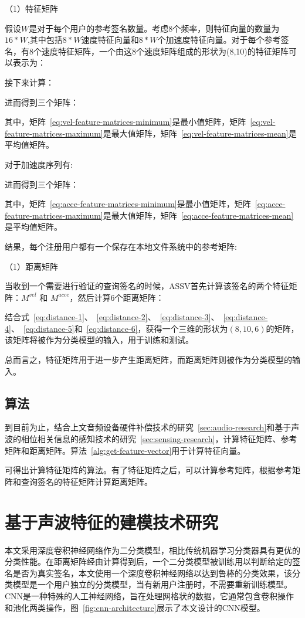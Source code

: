 （1）特征矩阵

假设$W$是对于每个用户的参考签名数量。考虑8个频率，则特征向量的数量为$16*W$,其中包括$8*W$速度特征向量和$8*W$个加速度特征向量。对于每个参考签名，有8个速度特征矩阵，一个由这8个速度矩阵组成的形状为(8,10)的特征矩阵可以表示为：

接下来计算：

进而得到三个矩阵：

其中，矩阵~\ref{eq:vel-feature-matrices-minimum}是最小值矩阵，矩阵~\ref{eq:vel-feature-matrices-maximum}是最大值矩阵，矩阵~\ref{eq:vel-feature-matrices-mean}是平均值矩阵。

对于加速度序列有:

进而得到三个矩阵：

其中，矩阵~\ref{eq:acce-feature-matrices-minimum}是最小值矩阵，矩阵~\ref{eq:acce-feature-matrices-maximum}是最大值矩阵，矩阵~\ref{eq:acce-feature-matrices-mean}是平均值矩阵。

结果，每个注册用户都有一个保存在本地文件系统中的参考矩阵:

（1）距离矩阵

当收到一个需要进行验证的查询签名的时候，ASSV首先计算该签名的两个特征矩阵：$M^{vel}$ 和 $M^{acce}$，然后计算6个距离矩阵：

结合式~\ref{eq:distance-1}、~\ref{eq:distance-2}、~\ref{eq:distance-3}、~\ref{eq:distance-4}、~\ref{eq:distance-5}和~\ref{eq:distance-6}，获得一个三维的形状为$(8,10,6)$的矩阵，该矩阵将被作为分类模型的输入，用于训练和测试。

总而言之，特征矩阵用于进一步产生距离矩阵，而距离矩阵则被作为分类模型的输入。

\subsection{算法}
到目前为止，结合上文音频设备硬件补偿技术的研究~\ref{sec:audio-research}和基于声波的相位相关信息的感知技术的研究~\ref{sec:sensing-research}，计算特征矩阵、参考矩阵和距离矩阵。算法~\ref{alg:get-feature-vector}用于计算特征向量。

可得出计算特征矩阵的算法。有了特征矩阵之后，可以计算参考矩阵，根据参考矩阵和查询签名的特征矩阵计算距离矩阵。

\section{基于声波特征的建模技术研究}
本文采用深度卷积神经网络作为二分类模型，相比传统机器学习分类器具有更优的分类性能。在距离矩阵经由计算得到后，一个二分类模型被训练用以判断给定的签名是否为真实签名，本文使用一个深度卷积神经网络以达到鲁棒的分类效果，该分类模型是一个用户独立的分类模型，当有新用户注册时，不需要重新训练模型。CNN是一种特殊的人工神经网络，旨在处理网格状的数据，它通常包含卷积操作和池化两类操作，图~\ref{fig:cnn-architecture}展示了本文设计的CNN模型。


